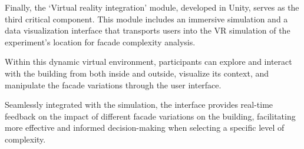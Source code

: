 
Finally, the `Virtual reality integration' module, developed in Unity, serves as the third critical component.
This module includes an immersive simulation and a data visualization interface that transports users into the VR simulation of the experiment's location for facade complexity analysis.

Within this dynamic virtual environment, participants can explore and interact with the building from both inside and outside, visualize its context, and manipulate the facade variations through the user interface.

Seamlessly integrated with the simulation, the interface provides real-time feedback on the impact of different facade variations on the building, facilitating more effective and informed decision-making when selecting a specific level of complexity.


